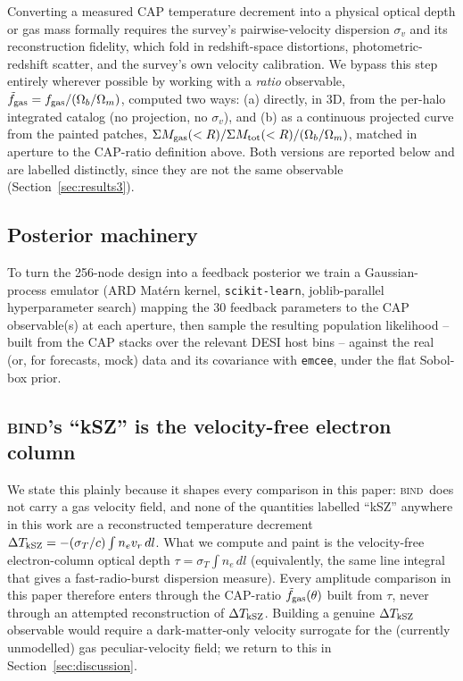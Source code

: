\documentclass[11pt]{article}
\newcommand{\bind}{\textsc{bind}}
\newcommand{\fgas}{f_{\rm gas}}
\newcommand{\fgt}{\tilde{f}_{\rm gas}}          %
\begin{document}
Converting a measured CAP temperature decrement into a physical optical depth
or gas mass formally requires the survey's pairwise-velocity dispersion
$\sigma_v$ and its reconstruction fidelity, which fold in redshift-space
distortions, photometric-redshift scatter, and the survey's own velocity
calibration. We bypass this step entirely wherever possible by working with a
\emph{ratio} observable, $\fgt = \fgas/(\Omega_b/\Omega_m)$, computed two ways:
(a) directly, in 3D, from the per-halo integrated catalog (no projection, no
$\sigma_v$), and (b) as a continuous projected curve from the painted patches,
$\Sigma M_{\rm gas}(<R)/\Sigma M_{\rm tot}(<R)/(\Omega_b/\Omega_m)$, matched in
aperture to the CAP-ratio definition above. %
Both versions are reported below and are labelled distinctly, since they are
not the same observable (Section~\ref{sec:results3}).

\subsection{Posterior machinery}\label{sec:posterior}

To turn the 256-node design into a feedback posterior we train a Gaussian-process
emulator (ARD Mat\'ern kernel, \texttt{scikit-learn}, joblib-parallel
hyperparameter search) mapping the 30 feedback parameters to the CAP
observable(s) at each aperture, then sample the resulting population
likelihood -- built from the CAP stacks over the relevant DESI host bins --
against the real (or, for forecasts, mock) data and its covariance with
\texttt{emcee}, under the flat Sobol-box prior. %

\subsection{\bind's ``kSZ'' is the velocity-free electron column}\label{sec:velocityfree}

We state this plainly because it shapes every comparison in this paper:
\bind\ does not carry a gas velocity field, and none of the quantities labelled
``kSZ'' anywhere in this work are a reconstructed temperature decrement
$\Delta T_{\rm kSZ} = -(\sigma_T/c)\int n_e v_r\,dl$. What we compute and paint
is the velocity-free electron-column optical depth $\tau=\sigma_T\int n_e\,dl$
(equivalently, the same line integral that gives a fast-radio-burst dispersion
measure). %
Every amplitude comparison in this paper therefore enters through the CAP-ratio
$\fgt(\theta)$ built from $\tau$, never through an attempted reconstruction of
$\Delta T_{\rm kSZ}$. Building a genuine $\Delta T_{\rm kSZ}$ observable would
require a dark-matter-only velocity surrogate for the (currently unmodelled)
gas peculiar-velocity field; we return to this in Section~\ref{sec:discussion}.
\end{document}
